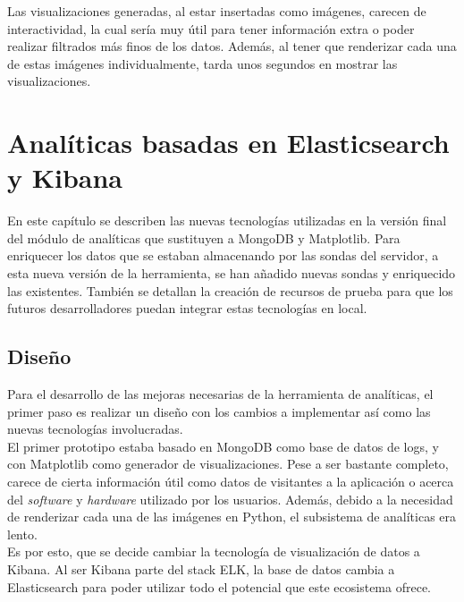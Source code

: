 \documentclass[a4paper, 12pt]{book}
\begin{document}
		Las visualizaciones generadas, al estar insertadas como imágenes, carecen de interactividad, la cual sería muy útil para tener información extra o poder realizar filtrados más finos de los datos. Además, al tener que renderizar cada una de estas imágenes individualmente, tarda unos segundos en mostrar las visualizaciones.
	
	
	\cleardoublepage 
	\chapter{Analíticas basadas en Elasticsearch y Kibana} 
	\label{chap:segundo_prototipo} 
		En este capítulo se describen las nuevas tecnologías utilizadas en la versión final del módulo de analíticas que sustituyen a MongoDB y Matplotlib. Para enriquecer los datos que se estaban almacenando por las sondas del servidor, a esta nueva versión de la herramienta, se han añadido nuevas sondas y enriquecido las existentes. También se detallan la creación de recursos de prueba para que los futuros desarrolladores puedan integrar estas tecnologías en local.
	
	\section{Diseño} 
	\label{sec:2_diseno} 
		Para el desarrollo de las mejoras necesarias de la herramienta de analíticas, el primer paso es realizar un diseño con los cambios a implementar así como las nuevas tecnologías involucradas. \\
		
		El primer prototipo  estaba basado en MongoDB como base de datos de logs, y con Matplotlib como generador de visualizaciones. Pese a ser bastante completo, carece de cierta información útil como datos de visitantes a la aplicación o acerca del \textit{software} y \textit{hardware} utilizado por los usuarios. Además, debido a la necesidad de renderizar cada una de las imágenes en Python, el subsistema de analíticas era lento. \\
		
		Es por esto, que se decide cambiar la tecnología de visualización de datos a Kibana. Al ser Kibana parte del stack ELK, la base de datos cambia a Elasticsearch para poder utilizar todo el potencial que este ecosistema ofrece. \\
		
\end{document}
